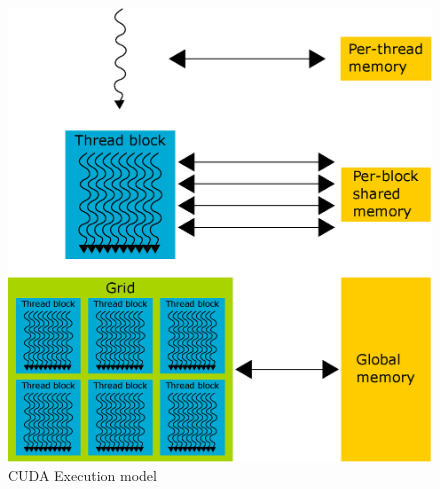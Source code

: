 \begin{figure}[h]
  \centering
  \includegraphics[width=0.8\linewidth]{img/CUDAmemoryHierarchy.eps}
  \caption{CUDA Execution model}
  \label{fig:cudamemhierarchy}
\end{figure}
